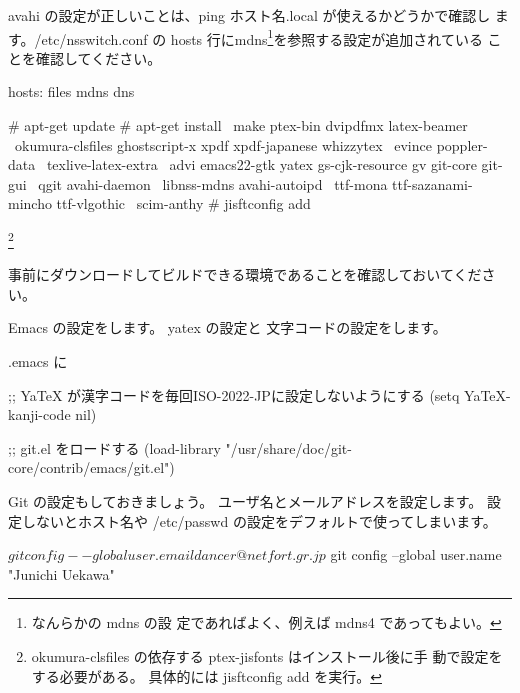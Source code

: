 \documentclass[mingoth,a4paper]{jsarticle}
\begin{document}
avahi の設定が正しいことは、ping ホスト名.local が使えるかどうかで確認し
ます。/etc/nsswitch.conf の hosts 行にmdns\footnote{なんらかの mdns の設
定であればよく、例えば mdns4 であってもよい。}を参照する設定が追加されている
ことを確認してください。

\begin{commandline}
hosts:          files mdns dns
\end{commandline}


\begin{commandline}
# apt-get update
# apt-get install \
 make ptex-bin dvipdfmx latex-beamer \
 okumura-clsfiles ghostscript-x xpdf xpdf-japanese whizzytex \
 evince poppler-data \
 texlive-latex-extra \
 advi emacs22-gtk yatex gs-cjk-resource gv git-core git-gui \
 qgit avahi-daemon \
 libnss-mdns avahi-autoipd \
 ttf-mona ttf-sazanami-mincho ttf-vlgothic \
 scim-anthy
# jisftconfig add
\end{commandline}
\footnote{okumura-clsfiles の依存する ptex-jisfonts はインストール後に手
動で設定をする必要がある。
具体的には jisftconfig add を実行。}

事前にダウンロードしてビルドできる環境であることを確認しておいてください。


Emacs の設定をします。
yatex の設定と
文字コードの設定をします。

.emacs に

\begin{commandline}
;; YaTeX が漢字コードを毎回ISO-2022-JPに設定しないようにする
(setq YaTeX-kanji-code nil)

;; git.el をロードする
(load-library "/usr/share/doc/git-core/contrib/emacs/git.el")
\end{commandline}

Git の設定もしておきましょう。
ユーザ名とメールアドレスを設定します。
設定しないとホスト名や /etc/passwd の設定をデフォルトで使ってしまいます。

\begin{commandline}
$ git config --global user.email dancer@netfort.gr.jp
$ git config --global user.name "Junichi Uekawa"
\end{commandline}
\end{document}
